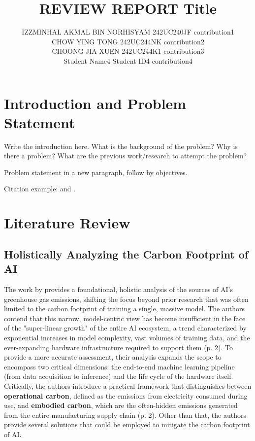 \documentclass[a4paper, 12pt]{article}
\author{
IZZMINHAL AKMAL BIN NORHISYAM \quad 242UC240JF \quad contribution1 \\
CHOW YING TONG \quad 242UC244NK \quad contribution2\\
CHOONG JIA XUEN \quad 242UC244K1 \quad contribution3\\
Student Name4 \quad Student ID4 \quad contribution4\\
}
\title{ REVIEW REPORT  Title  }
\begin{document}
\maketitle


\section{Introduction and Problem Statement}
Write the introduction here. What is the background of the problem? Why is there a problem? What are the previous work/research to attempt the problem? 

Problem statement in a new paragraph, follow by objectives.

Citation example: \cite{Termenchy15} and \cite{Jones19}.

\section{Literature Review}
\subsection{Holistically Analyzing the Carbon Footprint of AI}
\hspace{24pt}The work by \citet{Wu2022} provides a foundational, holistic analysis of the sources of AI's greenhouse gas emissions, shifting the focus beyond prior research that was often limited to the carbon footprint of training a single, massive model. The authors contend that this narrow, model-centric view has become insufficient in the face of the "super-linear growth" of the entire AI ecosystem, a trend characterized by exponential increases in model complexity, vast volumes of training data, and the ever-expanding hardware infrastructure required to support them (p. 2). To provide a more accurate assessment, their analysis expands the scope to encompass two critical dimensions: the end-to-end machine learning pipeline (from data acquisition to inference) and the life cycle of the hardware itself. Critically, the authors introduce a practical framework that distinguishes between \textbf{operational carbon}, defined as the emissions from electricity consumed during use, and \textbf{embodied carbon}, which are the often-hidden emissions generated from the entire manufacturing supply chain (p. 2). Other than that, the authors provide several solutions that could be employed to mitigate the carbon footprint of AI.
\end{document}
